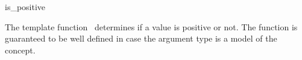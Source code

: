 \begin{ccRefFunction}{is_positive}

\ccDefinition

The template function \ccRefName\ determines if a value is positive or not.
The function is guaranteed to be well defined in case the argument type 
is a model of the  concept. 



\ccSeeAlso
{} \\
\\

\end{ccRefFunction}
